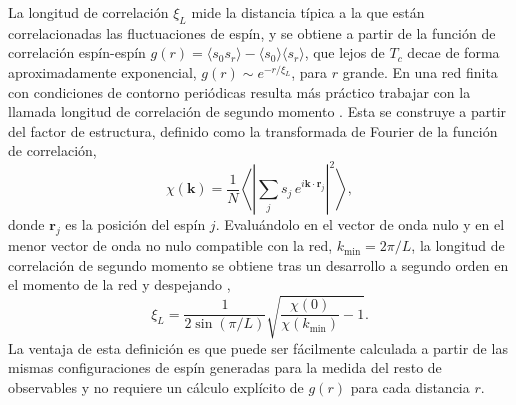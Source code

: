La longitud de correlación $\xi_L$ mide la distancia típica a la que están correlacionadas las fluctuaciones de espín, y se obtiene a partir de la función de correlación espín-espín $g(r) = \langle s_0 s_r \rangle - \langle s_0 \rangle \langle s_r \rangle$, que lejos de $T_c$ decae de forma aproximadamente exponencial, $g(r) \sim e^{-r/\xi_L}$, para $r$ grande. En una red finita con condiciones de contorno periódicas resulta más práctico trabajar con la llamada longitud de correlación de segundo momento \citep{Cooper1982, Newman1999}. Esta se construye a partir del factor de estructura, definido como la transformada de Fourier de la función de correlación,
\begin{equation} \label{eq:structure_factor}
    \chi(\mathbf{k}) = \frac{1}{N}\left\langle \left| \sum_j s_j\,
    e^{i\mathbf{k}\cdot\mathbf{r}_j} \right|^2 \right\rangle,
\end{equation}
donde $\mathbf{r}_j$ es la posición del espín $j$. Evaluándolo en el vector de
onda nulo y en el menor vector de onda no nulo compatible con la red, $k_{\min} = 2\pi/L$, la longitud de correlación de segundo momento se obtiene tras un desarrollo a segundo orden en el momento de la red y despejando \citep{Cooper1982},
\begin{equation} \label{eq:xi_def}
    \xi_L = \frac{1}{2\sin(\pi/L)}\sqrt{\frac{\chi(0)}{\chi(k_{\min})} - 1}.
\end{equation}
La ventaja de esta definición es que puede ser fácilmente calculada a partir de las mismas configuraciones de espín generadas para la medida del resto de observables y no requiere un cálculo explícito de $g(r)$ para cada distancia $r$.

